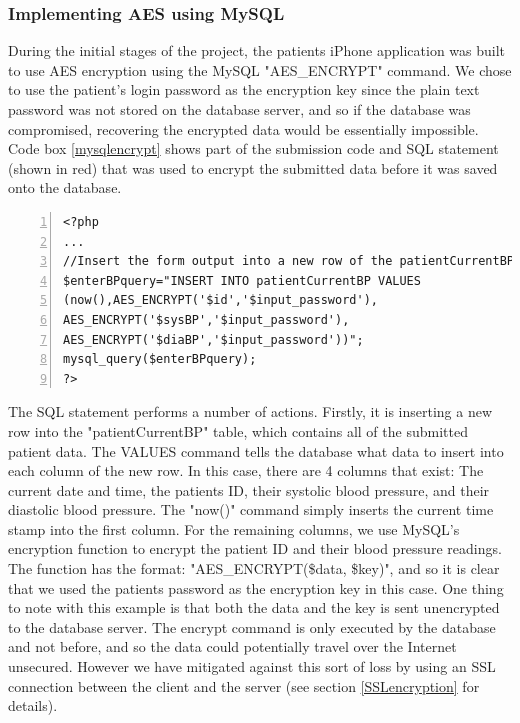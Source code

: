 \documentclass[11pt]{article}
\begin{document}
\subsubsection{Implementing AES using MySQL}

During the initial stages of the project, the patients iPhone application was built to use AES encryption using the MySQL "AES\_ENCRYPT" command. We chose to use the patient's login password as the encryption key since the plain text password was not stored on the database server, and so if the database was compromised, recovering the encrypted data would be essentially impossible. Code box \ref{mysqlencrypt} shows part of the submission code and SQL statement (shown in red) that was used to encrypt the submitted data before it was saved onto the database.



\begin{lstlisting}[float=ht,numbers=left,frame=lines,caption="Example code for submitting patient BP readings with included AES encrypt commands",label=mysqlencrypt,showstringspaces=false]
<?php
...
//Insert the form output into a new row of the patientCurrentBP table
$enterBPquery="INSERT INTO patientCurrentBP VALUES
(now(),AES_ENCRYPT('$id','$input_password'),
AES_ENCRYPT('$sysBP','$input_password'),
AES_ENCRYPT('$diaBP','$input_password'))";
mysql_query($enterBPquery);
?>

\end{lstlisting}


The SQL statement performs a number of actions. Firstly, it is inserting a new row into the "patientCurrentBP" table, which contains all of the submitted patient data. The VALUES command tells the database what data to insert into each column of the new row. In this case, there are 4 columns that exist: The current date and time, the patients ID, their systolic blood pressure, and their diastolic blood pressure. The "now()" command simply inserts the current time stamp into the first column. For the remaining columns, we use MySQL's encryption function to encrypt the patient ID and their blood pressure readings. The function has the format: "AES\_ENCRYPT(\$data, \$key)", and so it is clear that we used the patients password as the encryption key in this case. One thing to note with this example is that both the data and the key is sent unencrypted to the database server. The encrypt command is only executed by the database and not before, and so the data could potentially travel over the Internet unsecured. However we have mitigated against this sort of loss by using an SSL connection between the client and the server (see section \ref{SSLencryption} for details).
 
\end{document}
